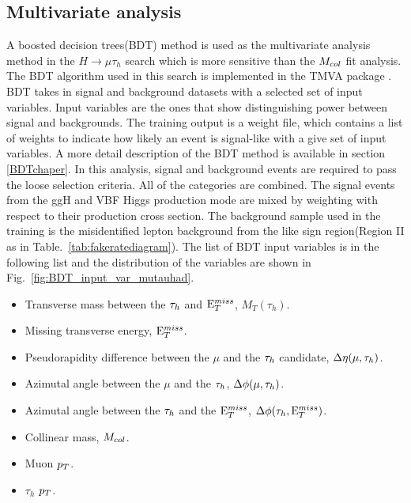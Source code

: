 \subsection{Multivariate analysis}
A boosted decision trees(BDT) method is used as the multivariate analysis method in the $H\rightarrow\mu\tau_h$ search which is more sensitive than the $M_{col}$ fit analysis. The BDT algorithm used in this search is implemented in the TMVA package \cite{TMVAnote}. BDT takes in signal and background datasets with a selected set of input variables. Input variables are the ones that show distinguishing power between signal and backgrounds. The training output is a weight file, which contains a list of weights to indicate how likely an event is signal-like with a give set of input variables. A more detail description of the BDT method is available in section \ref{BDTchaper}.  In this analysis, signal and background events are required to pass the loose selection criteria. All of the categories are combined. The signal events from the ggH and VBF Higgs production mode are mixed by weighting with respect to their production cross section. The background sample used in the training is the misidentified lepton background from the like sign region(Region II as in Table.~\ref{tab:fakeratediagram}). The list of BDT input variables  is in the following list and the distribution of the variables are shown in Fig.~\ref{fig:BDT_input_var_mutauhad}.

\begin{itemize}
\item Transverse mass between the $\tau_{h}$ and $\mathrm{E}_{T}^{miss}$, $M_{T}(\tau_{h})$.
\item Missing transverse energy, $\mathrm{E}_{T}^{miss}$.
\item Pseudorapidity difference between the $\mu$ and the $\tau_{h}$ candidate, $\Delta\eta(\mu, \tau_{h})$.
\item Azimutal angle between the $\mu$ and the $\tau_{h}$, $\Delta\phi (\mu,\tau_{h})$.
\item Azimutal angle between the $\tau_{h}$ and the $\mathrm{E}_{T}^{miss}$, $\Delta\phi(\tau_h,\mathrm{E}_{T}^{miss})$.
\item Collinear mass, $M_{col}$.
\item Muon $p_{T}$.
\item $\tau_h$ $p_{T}$.
\end{itemize}

